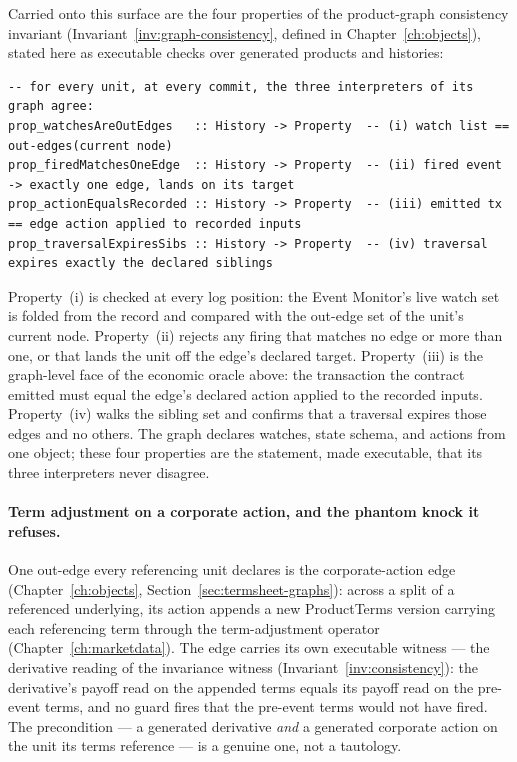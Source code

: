 Carried onto this surface are the four properties of the product-graph consistency invariant
(Invariant~\ref{inv:graph-consistency}, defined in Chapter~\ref{ch:objects}), stated here as
executable checks over generated products and histories:

\begin{lstlisting}
-- for every unit, at every commit, the three interpreters of its graph agree:
prop_watchesAreOutEdges   :: History -> Property  -- (i) watch list == out-edges(current node)
prop_firedMatchesOneEdge  :: History -> Property  -- (ii) fired event -> exactly one edge, lands on its target
prop_actionEqualsRecorded :: History -> Property  -- (iii) emitted tx == edge action applied to recorded inputs
prop_traversalExpiresSibs :: History -> Property  -- (iv) traversal expires exactly the declared siblings
\end{lstlisting}

Property~(i) is checked at every log position: the Event Monitor's live watch set is folded
from the record and compared with the out-edge set of the unit's current node. Property~(ii)
rejects any firing that matches no edge or more than one, or that lands the unit off the
edge's declared target. Property~(iii) is the graph-level face of the economic oracle above:
the transaction the contract emitted must equal the edge's declared action applied to the
recorded inputs. Property~(iv) walks the sibling set and confirms that a traversal expires
those edges and no others. The graph declares watches, state schema, and actions from one
object; these four properties are the statement, made executable, that its three interpreters
never disagree.

\paragraph{Term adjustment on a corporate action, and the phantom knock it refuses.}
One out-edge every referencing unit declares is the corporate-action edge
(Chapter~\ref{ch:objects}, Section~\ref{sec:termsheet-graphs}): across a split of a referenced
underlying, its action appends a new ProductTerms version carrying each referencing term
through the term-adjustment operator (Chapter~\ref{ch:marketdata}). The edge carries its own
executable witness --- the derivative reading of the invariance witness
(Invariant~\ref{inv:consistency}): the derivative's payoff read on the appended terms equals
its payoff read on the pre-event terms, and no guard fires that the pre-event terms would not
have fired. The precondition --- a generated derivative \emph{and} a generated corporate action
on the unit its terms reference --- is a genuine one, not a tautology.

